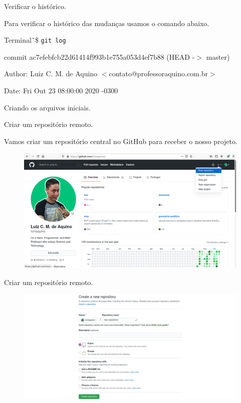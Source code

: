 \documentclass[brazil,aspectratio=169]{beamer}
\newcommand{\terminal}[1]{\textcolor{my-green}{\texttt{#1}}}
\begin{document}
\begin{frame}{Verificar o histórico.}

  Para verificar o histórico das mudanças usamos o comando abaixo.

  \begin{exampleblock}{Terminal}
    \~\,\$ \terminal{git log}

    commit ac7efebfcb22d61414f993b1e755a053d4ef7b88 (HEAD -$>$ master)

    Author: Luiz C. M. de Aquino $<$contato@professoraquino.com.br$>$

    Date: Fri Out 23 08:00:00 2020 -0300

    Criando os arquivos iniciais.
  \end{exampleblock}
  
\end{frame}

\begin{frame}{Criar um repositório remoto.}

Vamos criar um repositório central no GitHub para receber o nosso projeto.

\begin{figure}
 \includegraphics[scale=0.3]{imagens/novo-repositorio-github-1}
\end{figure}
\end{frame}

\begin{frame}{Criar um repositório remoto.}

\begin{figure}
 \includegraphics[scale=0.3]{imagens/novo-repositorio-github-2}
\end{figure}
\end{frame}
\end{document}
